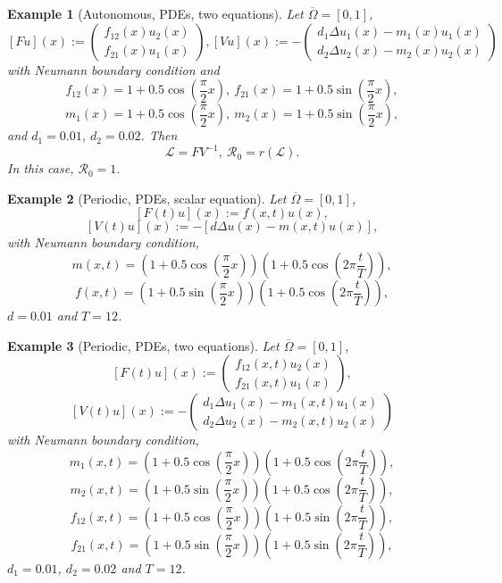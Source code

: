 \documentclass[12pt,reqno]{article}
\newtheorem{example}{Example}
\newcommand{\oOmega}{\overline{\Omega}}
\newcommand{\cL}{\mathcal{L}}
\newcommand{\R}{\mathcal{R}_0}
\begin{document}
\begin{example}[Autonomous, PDEs, two equations] Let $\oOmega=[0,1]$,
	$$
	[F u](x) :=
	\left(
	\begin{matrix}
	f_{12} (x) u_2(x) \\
	f_{21} (x) u_1(x)
	\end{matrix}
	\right),
	[V u](x) :=-
	\left(
	\begin{matrix}
	d_1 \Delta u_1(x) - m_1(x) u_1(x) \\
	d_2 \Delta u_2(x) - m_2(x) u_2(x)
	\end{matrix}
	\right)$$ with Neumann boundary condition and
	$$f_{12}(x)=1+0.5\cos(\frac{\pi}{2} x),~ f_{21}(x)= 1+ 0.5\sin(\frac{\pi}{2} x),$$ $$m_1(x)=1+0.5\cos(\frac{\pi}{2} x),~ m_2(x)=1+0.5\sin(\frac{\pi}{2} x),$$ and $d_1=0.01$, $d_2=0.02$.
	Then
	$$
	\cL=FV^{-1},~
	\R=r(\cL).
	$$
	In this case, $\R=1$.
\end{example}


\begin{example}[Periodic, PDEs, scalar equation] Let $\oOmega=[0,1]$,
	$$[F(t) u](x) := f(x,t) u(x),$$
	$$[V(t) u](x) :=- [d \Delta u(x) - m(x,t) u(x)],$$ with Neumann boundary condition, $$m(x,t)=(1+0.5\cos(\frac{\pi}{2} x))(1+0.5\cos(2\pi \frac{t}{T})),$$
	$$f(x,t)=(1 +0.5 \sin(\frac{\pi}{2} x))(1+0.5\cos(2\pi \frac{t}{T})),$$  $d=0.01$ and $T=12$.
\end{example}


\begin{example}[Periodic, PDEs, two equations] Let $\oOmega=[0,1]$,
	$$[F(t) u](x) := 	\left(
	\begin{matrix}
	f_{12} (x,t) u_2(x) \\
	f_{21} (x,t) u_1(x)
	\end{matrix}
	\right),$$
	$$[V(t) u](x) :=	
	-\left(
	\begin{matrix}
	d_1 \Delta u_1(x) - m_1(x,t) u_1(x) \\
	d_2 \Delta u_2(x) - m_2(x,t) u_2(x)
	\end{matrix}
	\right)$$ with Neumann boundary condition,
	$$m_1(x,t)=(1+0.5\cos(\frac{\pi}{2} x))(1+0.5\cos(2\pi \frac{t}{T})),$$
	$$m_2(x,t)=(1+0.5\sin(\frac{\pi}{2} x))(1+0.5\cos(2\pi \frac{t}{T})),$$
	$$f_{12}(x,t)=(1 +0.5 \cos(\frac{\pi}{2} x))(1+0.5\sin(2\pi \frac{t}{T})),$$
	$$f_{21}(x,t)=(1 +0.5 \sin(\frac{\pi}{2} x))(1+0.5\sin(2\pi \frac{t}{T})),$$
	$d_1=0.01$, $d_2=0.02$ and $T=12$.
\end{example}
\end{document}
